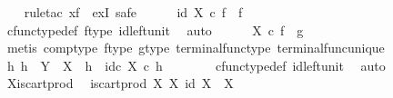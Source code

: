 \begin{isabellebody}
\ \ \isamarkupfalse%
\ {\isacharparenleft}{\kern0pt}rule{\isacharunderscore}{\kern0pt}tac\ x{\isacharequal}{\kern0pt}f\ \ exI{\isacharcomma}{\kern0pt}\ safe{\isacharparenright}{\kern0pt}\isanewline
\ \ \ \ \isamarkupfalse%
\ {\isachardoublequoteopen}id\ X\ {\isasymcirc}\isactrlsub c\ f\ {\isacharequal}{\kern0pt}\ f{\isachardoublequoteclose}\isanewline
\ \ \ \ \ \ \isamarkupfalse%
\ cfunc{\isacharunderscore}{\kern0pt}type{\isacharunderscore}{\kern0pt}def\ f{\isacharunderscore}{\kern0pt}type\ id{\isacharunderscore}{\kern0pt}left{\isacharunderscore}{\kern0pt}unit\ \isamarkupfalse%
\ auto\isanewline
\ \ \ \ \isamarkupfalse%
\ {\isachardoublequoteopen}{\isasymbeta}\isactrlbsub X\isactrlesub \ {\isasymcirc}\isactrlsub c\ f\ {\isacharequal}{\kern0pt}\ g{\isachardoublequoteclose}\isanewline
\ \ \ \ \ \ \isamarkupfalse%
\ {\isacharparenleft}{\kern0pt}metis\ comp{\isacharunderscore}{\kern0pt}type\ f{\isacharunderscore}{\kern0pt}type\ g{\isacharunderscore}{\kern0pt}type\ terminal{\isacharunderscore}{\kern0pt}func{\isacharunderscore}{\kern0pt}type\ terminal{\isacharunderscore}{\kern0pt}func{\isacharunderscore}{\kern0pt}unique{\isacharparenright}{\kern0pt}\isanewline
\ \ \ \ \isamarkupfalse%
\ {\isachardoublequoteopen}{\isasymAnd}h{}{\isachardot}{\kern0pt}\ h{}\ {\isacharcolon}{\kern0pt}\ Y\ {\isasymrightarrow}\ X\ {\isasymLongrightarrow}\ h{}\ {\isacharequal}{\kern0pt}\ id\isactrlsub c\ X\ {\isasymcirc}\isactrlsub c\ h{}{\isachardoublequoteclose}\isanewline
\ \ \ \ \ \ \isamarkupfalse%
\ cfunc{\isacharunderscore}{\kern0pt}type{\isacharunderscore}{\kern0pt}def\ id{\isacharunderscore}{\kern0pt}left{\isacharunderscore}{\kern0pt}unit\ \isamarkupfalse%
\ auto\isanewline
\ \ \isamarkupfalse%
\isanewline
{}\isamarkupfalse%
%
\endisatagproof
{\isafoldproof}%
%
\isadelimproof
\isanewline
%
\endisadelimproof
\isanewline
{}\isamarkupfalse%
\ X{\isacharunderscore}{\kern0pt}is{\isacharunderscore}{\kern0pt}cart{\isacharunderscore}{\kern0pt}prod{}{\isacharcolon}{\kern0pt}\isanewline
\ \ {\isachardoublequoteopen}is{\isacharunderscore}{\kern0pt}cart{\isacharunderscore}{\kern0pt}prod\ X\ {\isacharparenleft}{\kern0pt}{\isasymbeta}\isactrlbsub X\isactrlesub {\isacharparenright}{\kern0pt}\ {\isacharparenleft}{\kern0pt}id\ X{\isacharparenright}{\kern0pt}\ {\isasymone}\ X{\isachardoublequoteclose}\isanewline
%
\isadelimproof

\end{isabellebody}
